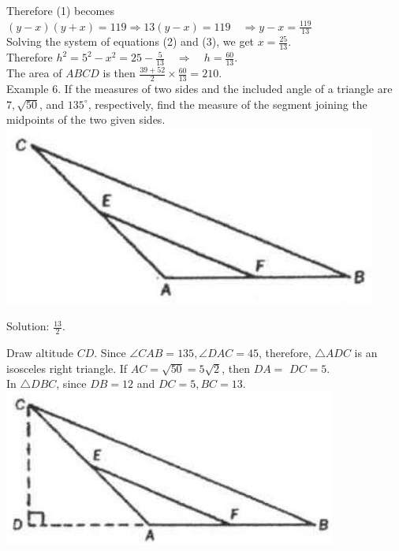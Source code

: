 \documentclass[10pt]{article}
\begin{document}
Therefore (1) becomes\\
\((y-x)(y+x)=119 \Rightarrow 13(y-x)=119 \quad \Rightarrow y-x=\frac{119}{13}\)\\
Solving the system of equations (2) and (3), we get \(x=\frac{25}{13}\).\\
Therefore \(h^{2}=5^{2}-x^{2}=25-\frac{5}{13} \quad \Rightarrow \quad h=\frac{60}{13}\).\\
The area of \(A B C D\) is then \(\frac{39+52}{2} \times \frac{60}{13}=210\).\\
Example 6. If the measures of two sides and the included angle of a triangle are \(7, \sqrt{50}\), and \(135^{\circ}\), respectively, find the measure of the segment joining the midpoints of the two given sides.\\
\includegraphics[max width=\textwidth, center]{2025_04_17_97bc1f7e44d93c271a88g-078}

Solution: \(\frac{13}{2}\).


Draw altitude \(C D\). Since \(\angle C A B=135, \angle D A C=45\), therefore, \(\triangle A D C\) is an isosceles right triangle. If \(A C=\sqrt{50}=5 \sqrt{2}\), then \(D A=\) \(D C=5\).\\
In \(\triangle D B C\), since \(D B=12\) and \(D C=5, B C=13\).\\
\includegraphics[max width=\textwidth, center]{2025_04_17_97bc1f7e44d93c271a88g-079}
\end{document}
